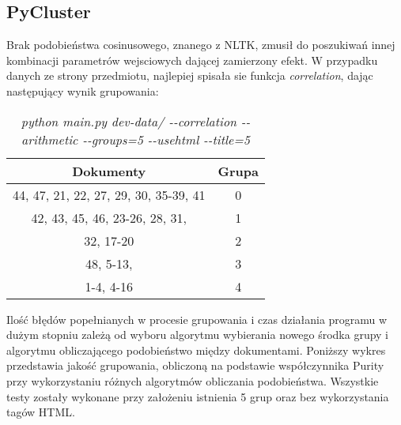 \documentclass{article}
\begin{document}
\subsection{PyCluster}
Brak podobieństwa cosinusowego, znanego z NLTK, zmusił do poszukiwań innej kombinacji parametrów wejsciowych dającej zamierzony efekt. W przypadku danych ze strony przedmiotu, najlepiej spisała sie funkcja \emph{correlation}, dając następujący wynik grupowania:

\begin{table}[H]
\begin{center}
\begin{tabular}{ | c | c | }
\hline
Dokumenty & Grupa \\ \hline
44, 47, 21, 22, 27, 29, 30, 35-39, 41 & 0 \\ \hline
42, 43, 45, 46, 23-26, 28, 31,  & 1 \\ \hline
32, 17-20 & 2 \\ \hline
48, 5-13,  & 3 \\ \hline
1-4, 4-16 & 4 \\ \hline
\end{tabular}
\caption{\emph{python main.py dev-data/ -{}-correlation -{}-arithmetic -{}-groups=5 -{}-usehtml -{}-title=5}}
\end{center}
\end{table}

Ilość błędów popełnianych w procesie grupowania i czas działania programu w dużym stopniu zależą od wyboru algorytmu wybierania nowego środka grupy i algorytmu obliczającego podobieństwo między dokumentami. Poniższy wykres przedstawia jakość grupowania, obliczoną na podstawie współczynnika Purity przy wykorzystaniu różnych algorytmów obliczania podobieństwa. Wszystkie testy zostały wykonane przy założeniu istnienia 5 grup oraz bez wykorzystania tagów HTML.

\begin{center}
\end{center}
\end{document}
